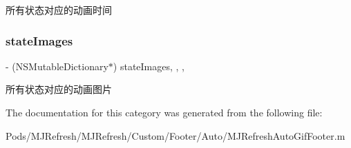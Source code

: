 所有状态对应的动画时间 \mbox{\label{category_m_j_refresh_auto_gif_footer_07_08_aeb717f20369197cca94ee78bed65bade}} 
\subsubsection{\texorpdfstring{state\+Images}{stateImages}}
{\footnotesize\ttfamily -\/ (N\+S\+Mutable\+Dictionary$\ast$) state\+Images\hspace{0.3cm}{\ttfamily [read]}, {\ttfamily [write]}, {\ttfamily [nonatomic]}, {\ttfamily [strong]}}

所有状态对应的动画图片 

The documentation for this category was generated from the following file\+:\begin{DoxyCompactItemize}
\item 
Pods/\+M\+J\+Refresh/\+M\+J\+Refresh/\+Custom/\+Footer/\+Auto/M\+J\+Refresh\+Auto\+Gif\+Footer.\+m\end{DoxyCompactItemize}

